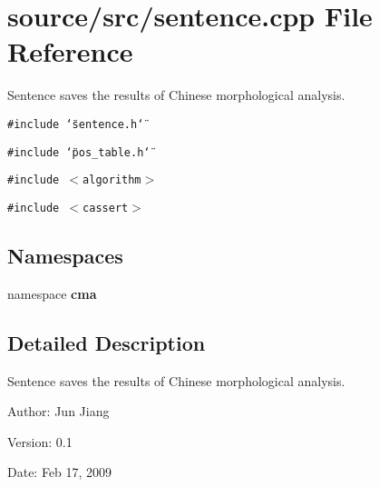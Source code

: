 \section{source/src/sentence.cpp File Reference}
\label{sentence_8cpp}
Sentence saves the results of Chinese morphological analysis. 

{\tt \#include \char`\"{}sentence.h\char`\"{}}\par
{\tt \#include \char`\"{}pos\_\-table.h\char`\"{}}\par
{\tt \#include $<$algorithm$>$}\par
{\tt \#include $<$cassert$>$}\par
\subsection*{Namespaces}
\begin{CompactItemize}
\item 
namespace \textbf{cma}
\end{CompactItemize}


\subsection{Detailed Description}
Sentence saves the results of Chinese morphological analysis. 

\begin{Desc}
\item[Author:]Jun Jiang \end{Desc}
\begin{Desc}
\item[Version:]0.1 \end{Desc}
\begin{Desc}
\item[Date:]Feb 17, 2009 \end{Desc}

